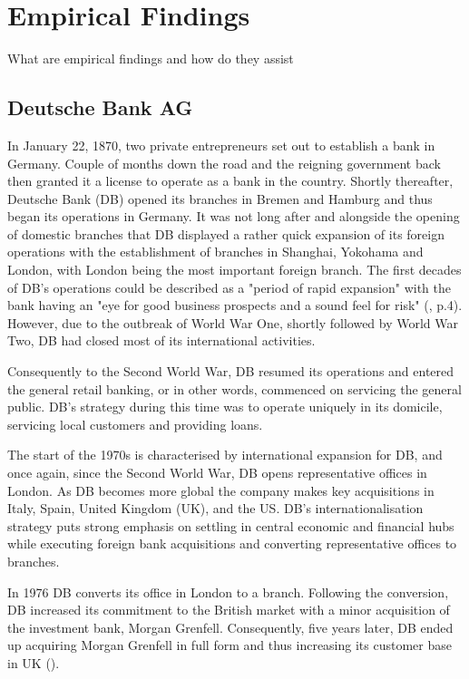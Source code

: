 \documentclass[11pt,a4paper]{article}
\begin{document}
{{%




\section{Empirical Findings}
\label{emp_findings}
What are empirical findings and how do they assist
\subsection{Deutsche Bank AG}
In January 22, 1870, two private entrepreneurs set out to establish a bank in Germany. Couple of months down the road and the reigning government back then granted it a license to operate as a bank in the country. Shortly thereafter, Deutsche Bank (DB) opened its branches in Bremen and Hamburg and thus began its operations in Germany. It was not long after and alongside the opening of domestic branches that DB displayed a rather quick expansion of its foreign operations with the establishment of branches in Shanghai, Yokohama and London, with London being the most important foreign branch. The first decades of DB's operations could be described as a "period of rapid expansion" with the bank having an "eye for good business prospects and a sound feel for risk" (\cite{deutschebankagDeutscheBank1870}, p.4). However, due to the outbreak of World War One, shortly followed by World War Two, DB had closed most of its international activities. \par
Consequently to the Second World War, DB resumed its operations and entered the general retail banking, or in other words, commenced on servicing the general public. DB's strategy during this time was to operate uniquely in its domicile, servicing local customers and providing loans.  \par
The start of the 1970s  is characterised by international expansion for DB, and once again, since the Second World War, DB opens representative offices in London. As DB becomes more global the company makes key acquisitions in Italy, Spain, United Kingdom (UK), and the US. DB's internationalisation strategy puts strong emphasis on settling in central economic and financial hubs while executing foreign bank acquisitions and converting representative offices to branches. \par
In 1976 DB converts its office in London to a branch. Following the conversion, DB increased its commitment to the British market with a minor acquisition of the investment bank, Morgan Grenfell. Consequently, five years later, DB ended up acquiring Morgan Grenfell in full form and thus increasing its customer base in UK (\cite{deutschebankagDeutscheBankUnited}). \par %
}}
\end{document}
